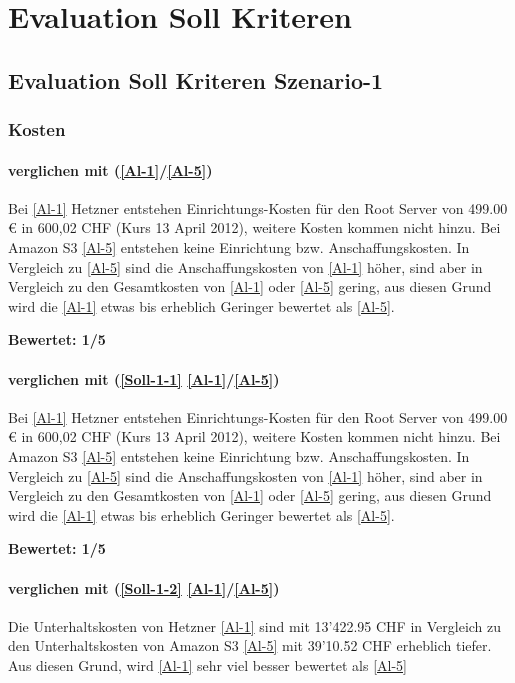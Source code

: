 \section{Evaluation Soll Kriteren}
\subsection{Evaluation Soll Kriteren Szenario-1}

\subsubsection{Kosten}

\paragraph*{  verglichen mit  (\ref{Al-1}/\ref{Al-5})}
Bei \ref{Al-1} Hetzner entstehen Einrichtungs-Kosten für den Root Server von 499.00 € in 600,02 CHF (Kurs 13 April 2012), weitere Kosten kommen nicht hinzu. Bei Amazon S3 \ref{Al-5} entstehen keine Einrichtung bzw. Anschaffungskosten. In Vergleich zu \ref{Al-5} sind die Anschaffungskosten von \ref{Al-1} höher, sind aber in Vergleich zu den Gesamtkosten von \ref{Al-1} oder \ref{Al-5} gering, aus diesen Grund wird die \ref{Al-1} etwas bis erheblich Geringer bewertet als \ref{Al-5}.

\textbf{Bewertet: 1/5}

\paragraph*{  verglichen mit  (\ref{Soll-1-1}  \ref{Al-1}/\ref{Al-5})}
Bei \ref{Al-1} Hetzner entstehen Einrichtungs-Kosten für den Root Server von 499.00 € in 600,02 CHF (Kurs 13 April 2012), weitere Kosten kommen nicht hinzu. Bei Amazon S3 \ref{Al-5} entstehen keine Einrichtung bzw. Anschaffungskosten. In Vergleich zu \ref{Al-5} sind die Anschaffungskosten von \ref{Al-1} höher, sind aber in Vergleich zu den Gesamtkosten von \ref{Al-1} oder \ref{Al-5} gering, aus diesen Grund wird die \ref{Al-1} etwas bis erheblich Geringer bewertet als \ref{Al-5}.

\textbf{Bewertet: 1/5}

\paragraph*{  verglichen mit  (\ref{Soll-1-2}  \ref{Al-1}/\ref{Al-5})}
Die Unterhaltskosten von Hetzner \ref{Al-1} sind mit 13'422.95 CHF in Vergleich zu den Unterhaltskosten von Amazon S3 \ref{Al-5} mit 39'10.52 CHF erheblich tiefer. Aus diesen Grund, wird \ref{Al-1} sehr viel besser bewertet als \ref{Al-5}

